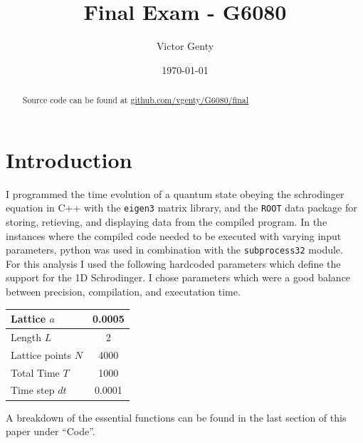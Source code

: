 \documentclass[singlepage,notitlepage,nofootinbib,11pt]{revtex4-1}
\begin{document}
\title{Final Exam - G6080}
\author{Victor Genty}
\date{\today}
\begin{abstract}
\centering
Source code can be found at \href{https://github.com/vgenty/G6080/tree/master/final}{github.com/vgenty/G6080/final}
\end{abstract}
\maketitle
\section*{Introduction}
I programmed the time evolution of a quantum state obeying the schrodinger equation in C++ with the \texttt{eigen3} matrix library, and the \texttt{ROOT} data package for storing, retieving, and displaying data from the compiled program. In the instances where the compiled code needed to be executed with varying input parameters, python was used in combination with the \texttt{subprocess32} module.\\
\indent For this analysis I used the following hardcoded parameters which define the support for the 1D Schrodinger. I chose parameters which were a good balance between precision, compilation, and executation time.
\begin{center}
  \begin{tabular}{| l | c |}\hline
    Lattice $a$ & 0.0005 \\\hline
    Length $L$  & 2 \\\hline
    Lattice points $N$ & 4000\\ \hline
    Total Time $T$ & 1000 \\ \hline
    Time step $dt$ & 0.0001 \\ \hline
    \end{tabular}
\end{center}
\indent\indent A breakdown of the essential functions can be found in the last section of this paper under ``Code''.
\end{document}
